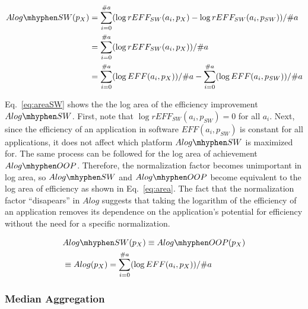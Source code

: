 \begingroup\makeatletter{}\check@mathfonts
\vspace{-8pt}
\begin{equation}
\begin{split}
	Alog\mhyphen SW(p_{X})
	&= \sum_{i=0}^{\#a} ( \log rEFF_{SW}(a_{i}, p_{X}) - \log rEFF_{SW}(a_{i}, p_{SW}) ) / \#a \\
	&= \sum_{i=0}^{\#a} ( \log rEFF_{SW}(a_{i}, p_{X}) ) / \#a \\
	&= \sum_{i=0}^{\#a} ( \log EFF(a_{i}, p_{X}) ) / \#a - \sum_{i=0}^{\#a} ( \log EFF(a_i, p_{SW}) ) / \#a
\label{eq:areaSW}
\end{split}
\end{equation}
\endgroup

Eq.~\eqref{eq:areaSW} shows the the log area of the efficiency improvement $Alog\mhyphen SW$. First, note that $\log rEFF_{SW}(a_i, p_{SW}) = 0$ for all $a_i$. Next, since the efficiency of an application in software $EFF(a_i, p_{SW})$ is constant for all applications, it does not affect which platform $Alog\mhyphen SW$ is maximized for. The same process can be followed for the log area of achievement $Alog\mhyphen OOP$. Therefore, the normalization factor becomes unimportant in log area, so $Alog\mhyphen SW$ and $Alog\mhyphen OOP$ become equivalent to the log area of efficiency as shown in Eq.~\eqref{eq:area}. The fact that the normalization factor ``disapears'' in $Alog$ suggests that taking the logarithm of the efficiency of an application removes its dependence on the application's potential for efficiency without the need for a specific normalization. 


\begingroup\makeatletter{}\check@mathfonts
\vspace{-8pt}
\begin{equation}
\begin{split}
	&Alog\mhyphen SW(p_{X}) \equiv Alog\mhyphen OOP(p_{X}) \\
	&\equiv Alog(p_{X}) = \sum_{i=0}^{\#a} ( \log EFF(a_{i}, p_{X}) ) / \#a	
\end{split}
\label{eq:area}
\end{equation}
\endgroup

\subsubsection{Median Aggregation}

